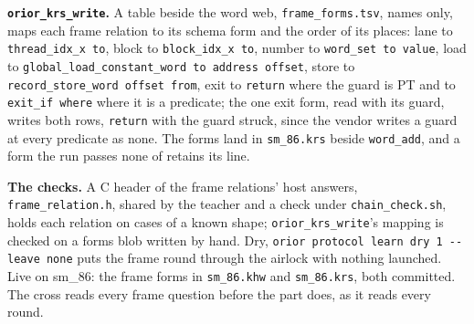 \textbf{\texttt{orior\_\allowbreak{}krs\_\allowbreak{}write}.} A table beside the word web, \texttt{frame\_\allowbreak{}forms.\allowbreak{}tsv}, names only, maps each frame relation to its schema form and the order of its places: lane to \texttt{thread\_\allowbreak{}idx\_\allowbreak{}x to}, block to \texttt{block\_\allowbreak{}idx\_\allowbreak{}x to}, number to \texttt{word\_\allowbreak{}set to value}, load to \texttt{global\_\allowbreak{}load\_\allowbreak{}constant\_\allowbreak{}word to address offset}, store to \texttt{record\_\allowbreak{}store\_\allowbreak{}word offset from}, exit to \texttt{return} where the guard is PT and to \texttt{exit\_\allowbreak{}if where} where it is a predicate; the one exit form, read with its guard, writes both rows, \texttt{return} with the guard struck, since the vendor writes a guard at every predicate as none. The forms land in \texttt{sm\_\allowbreak{}86.\allowbreak{}krs} beside \texttt{word\_\allowbreak{}add}, and a form the run passes none of retains its line.

\textbf{The checks.} A C header of the frame relations' host answers, \texttt{frame\_\allowbreak{}relation.\allowbreak{}h}, shared by the teacher and a check under \texttt{chain\_\allowbreak{}check.\allowbreak{}sh}, holds each relation on cases of a known shape; \texttt{orior\_\allowbreak{}krs\_\allowbreak{}write}'s mapping is checked on a forms blob written by hand. Dry, \texttt{orior protocol learn dry 1 -\allowbreak{}-\allowbreak{}leave none} puts the frame round through the airlock with nothing launched. Live on sm\_\allowbreak{}86: the frame forms in \texttt{sm\_\allowbreak{}86.\allowbreak{}khw} and \texttt{sm\_\allowbreak{}86.\allowbreak{}krs}, both committed. The cross reads every frame question before the part does, as it reads every round.

